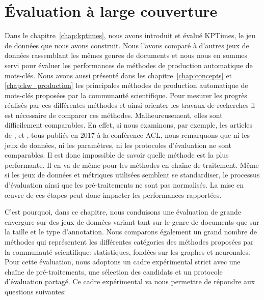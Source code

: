 \chapter{Évaluation à large couverture}\label{chap:large-scale-eval}


Dans le chapitre~\ref{chap:kptimes}, nous avons introduit et évalué KPTimes, le jeu de données que nous avons construit.
Nous l'avons comparé à d'autres jeux de données rassemblant les mêmes genres de documents et nous nous en sommes servi pour évaluer les performances de méthodes de production automatique de mots-clés.
%
Nous avons aussi présenté dans les chapitre~\ref{chap:concepts} et \ref{chap:kw_production} les principales méthodes de production automatique de mots-clés proposées par la communauté scientifique.
Pour mesurer les progrès réalisés par ces différentes méthodes et ainsi orienter les travaux de recherches il est nécessaire de comparer ces méthodes.
Malheureusement, elles sont difficilement comparables.
En effet, si nous examinons, par exemple, les articles de \citet{meng_deep_2017}, \citet{florescu_positionrank:_2017} et \citet{teneva_salience_2017}, tous publiés en 2017 à la conférence ACL, nous remarquons que ni les jeux de données, ni les paramètres, ni les protocoles d'évaluation ne sont comparables. Il est donc impossible de savoir quelle méthode est la plus performante.
Il en va de même pour les méthodes en chaîne de traitement.
Même si les jeux de données et métriques utilisées semblent se standardiser, le processus d'évaluation ainsi que les pré-traitements ne sont pas normalisés.
La mise en \oe{}uvre de ces étapes peut donc impacter les performances rapportées.

C'est pourquoi, dans ce chapitre, nous conduisons une évaluation de grande envergure sur des jeux de données variant tant sur le genre de documents que sur la taille et le type d'annotation. Nous comparons également un grand nombre de méthodes qui représentent les différentes catégories des méthodes proposées par la communauté scientifique: statistiques, fondées sur les graphes et neuronales. %
%
Pour cette évaluation, nous adoptons un cadre expérimental strict avec une chaîne de pré-traitements, une sélection des candidats et un protocole d'évaluation partagé.
Ce cadre expérimental va nous permettre de répondre aux questions suivantes: 

